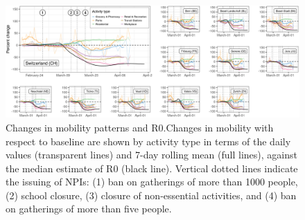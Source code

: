 \begin{figure}\centering
  \includegraphics{fig_covid-switzerland-npi/FIGURE_3.png}
  \caption[Changes in mobility patterns and R0.]{Changes in mobility patterns and R0.Changes in mobility with respect to baseline are shown by activity type in terms of the daily values (transparent lines) and 7-day rolling mean (full lines), against the median estimate of R0 (black line). Vertical dotted lines indicate the issuing of NPIs: (1) ban on gatherings of more than 1000 people, (2) school closure, (3) closure of non-essential activities, and (4) ban on gatherings of more than five people.}
  \label{fig:covid-ch-mobility}
\end{figure}


